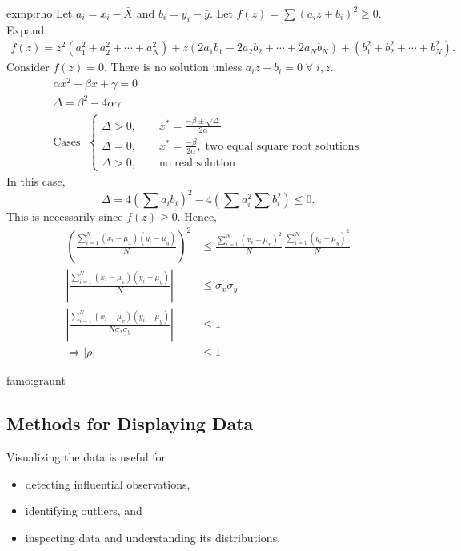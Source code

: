 		\begin{exmp}{exmp:rho}
			Let $a_i=x_i-\bar{X}$ and $b_i=y_i-\bar{y}$. Let $f(z)=\sum (a_i z + b_i)^2 \geq 0$. Expand:
			\begin{align*}
				f(z)=z^2(a_1^2+a_2^2+\cdots+a_N^2)+z(2a_1 b_1+2a_2 b_2+\cdots+2a_N b_N)+(b_1^2+b_2^2+\cdots+b_N^2).
			\end{align*}
			Consider $f(z)=0$. There is no solution unless $a_i z + b_i = 0 \;\forall\; i, z$.		
			\begin{gather*}
				\alpha x^2+\beta x + \gamma = 0\\ \Delta=\beta^2-4\alpha\gamma\\
				\text{Cases }\;\begin{cases}
					\Delta>0, \qquad x^*=\frac{-\beta \pm \sqrt{\Delta}}{2\alpha}\\
					\Delta=0, \qquad x^*=\frac{-\beta}{2\alpha},\;\text{two equal square root solutions}\\
					\Delta>0, \qquad \text{no real solution}
				\end{cases}
			\end{gather*}	
			In this case,
			\begin{equation*}
				\Delta=4\left(\sum a_i b_i\right)^2-4\left(\sum a_i^2 \sum b_i^2\right)\leq 0.
			\end{equation*}
			This is necessarily since $f(z)\geq0$. Hence,
			\begin{align*}
				\left(\frac{\sum\limits_{i=1}^N(x_i-\mu_x)(y_i-\mu_y)}{N}\right)^2&\leq\frac{\sum\limits_{i=1}^N(x_i-\mu_x)^2}{N}\,\frac{\sum\limits_{i=1}^N(y_i-\mu_y)^2}{N}\\
				\left|\frac{\sum\limits_{i=1}^N(x_i-\mu_x)(y_i-\mu_y)}{N}\right|&\leq\sigma_x \sigma_y\\
				\left|\frac{\sum\limits_{i=1}^N(x_i-\mu_x)(y_i-\mu_y)}{N\sigma_x \sigma_y}\right|&\leq 1\\
				\Longrightarrow |\rho|&\leq 1
			\end{align*}
		\end{exmp}
\begin{famo}{famo:graunt}
	
\end{famo}\pagebreak
\subsection{Methods for Displaying Data}
	Visualizing the data is useful for
	\begin{itemize}
		\item detecting influential observations,
		\item identifying outliers, and
		\item inspecting data and understanding its distributions. 
	\end{itemize}
